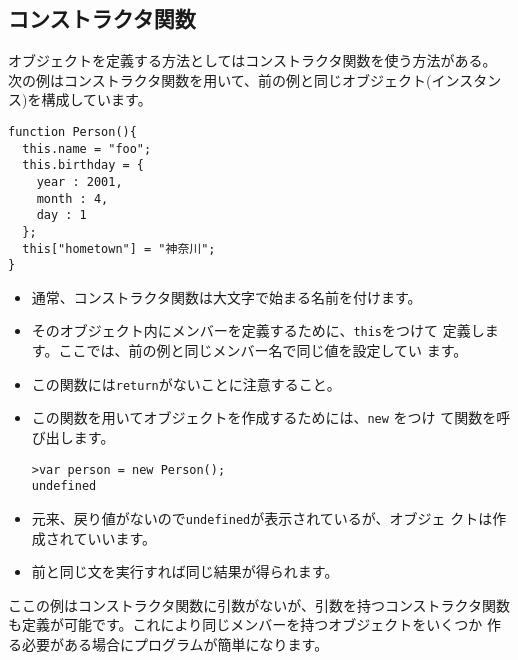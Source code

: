 \subsection{コンストラクタ関数}
オブジェクトを定義する方法としてはコンストラクタ関数を使う方法がある。
次の例はコンストラクタ関数を用いて、前の例と同じオブジェクト(インスタン
 ス)を構成しています。
\begin{Verbatim}
function Person(){
  this.name = "foo";
  this.birthday = {
    year : 2001,
    month : 4,
    day : 1
  };
  this["hometown"] = "神奈川";
}
\end{Verbatim}
\begin{itemize}
 \item 通常、コンストラクタ関数は大文字で始まる名前を付けます。
 \item そのオブジェクト内にメンバーを定義するために、\verb+this+をつけて
       定義します。ここでは、前の例と同じメンバー名で同じ値を設定してい
       ます。
 \item この関数には\verb+return+がないことに注意すること。
 \item この関数を用いてオブジェクトを作成するためには、\verb+new+ をつけ
       て関数を呼び出します。
\begin{Verbatim}
>var person = new Person();
undefined
\end{Verbatim}
 \item 元来、戻り値がないので\verb+undefined+が表示されているが、オブジェ
       クトは作成されていいます。
 \item 前と同じ文を実行すれば同じ結果が得られます。
\end{itemize}

ここの例はコンストラクタ関数に引数がないが、引数を持つコンストラクタ関数
 も定義が可能です。これにより同じメンバーを持つオブジェクトをいくつか
 作る必要がある場合にプログラムが簡単になります。

